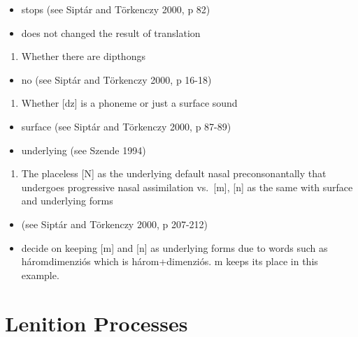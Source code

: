 \documentclass[12pt,]{article}
\providecommand{\tightlist}{%
  \setlength{\itemsep}{0pt}\setlength{\parskip}{0pt}}
\begin{document}
\begin{itemize}
\tightlist
\item
  stops (see Siptár and Törkenczy 2000, p 82)
\item
  does not changed the result of translation
\end{itemize}

\begin{enumerate}
\def\labelenumi{\arabic{enumi}.}
\setcounter{enumi}{1}
\tightlist
\item
  Whether there are dipthongs
\end{enumerate}

\begin{itemize}
\tightlist
\item
  no (see Siptár and Törkenczy 2000, p 16-18)
\end{itemize}

\begin{enumerate}
\def\labelenumi{\arabic{enumi}.}
\setcounter{enumi}{2}
\tightlist
\item
  Whether {[}dz{]} is a phoneme or just a surface sound
\end{enumerate}

\begin{itemize}
\tightlist
\item
  surface (see Siptár and Törkenczy 2000, p 87-89)
\item
  underlying (see Szende 1994)
\end{itemize}

\begin{enumerate}
\def\labelenumi{\arabic{enumi}.}
\setcounter{enumi}{3}
\tightlist
\item
  The placeless {[}N{]} as the underlying default nasal preconsonantally
  that undergoes progressive nasal assimilation vs.~{[}m{]}, {[}n{]} as
  the same with surface and underlying forms
\end{enumerate}

\begin{itemize}
\tightlist
\item
  (see Siptár and Törkenczy 2000, p 207-212)
\item
  decide on keeping {[}m{]} and {[}n{]} as underlying forms due to words
  such as háromdimenziós which is három+dimenziós. m keeps its place in
  this example.
\end{itemize}

\hypertarget{lenition-processes}{%
\section{Lenition Processes}\label{lenition-processes}}
\end{document}
